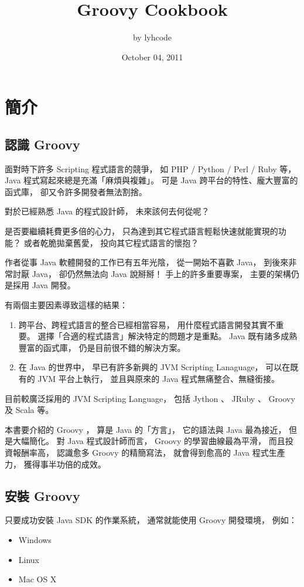 \documentclass[a4paper,12pt,english]{sphinxmanual}
\title{Groovy Cookbook}
\date{October 04, 2011}
\author{by lyhcode}
\begin{document}
\maketitle
\tableofcontents
{}\label{index::doc}



\chapter{簡介}
\label{intro:groovy-cookbook}\label{intro::doc}\label{intro:id1}

\section{認識 Groovy}
\label{intro:groovy}
面對時下許多 Scripting 程式語言的競爭，
如 PHP / Python / Perl / Ruby 等，
Java 程式寫起來總是充滿「麻煩與複雜」。
可是 Java 跨平台的特性、龐大豐富的函式庫，
卻又令許多開發者無法割捨。

對於已經熟悉 Java 的程式設計師，
未來該何去何從呢？

是否要繼續耗費更多倍的心力，
只為達到其它程式語言輕鬆快速就能實現的功能？
或者乾脆拋棄舊愛，
投向其它程式語言的懷抱？

作者從事 Java 軟體開發的工作已有五年光陰，
從一開始不喜歡 Java，
到後來非常討厭 Java，
卻仍然無法向 Java 說掰掰！
手上的許多重要專案，
主要的架構仍是採用 Java 開發。

有兩個主要因素導致這樣的結果：
\begin{enumerate}
\item {} 
跨平台、跨程式語言的整合已經相當容易，
用什麼程式語言開發其實不重要。
選擇「合適的程式語言」解決特定的問題才是重點。
Java 既有諸多成熟豐富的函式庫，
仍是目前很不錯的解決方案。

\item {} 
在 Java 的世界中，
早已有許多新興的 JVM Scripting Lanaguage，
可以在既有的 JVM 平台上執行，
並且與原來的 Java 程式無痛整合、無縫銜接。

\end{enumerate}

目前較廣泛採用的 JVM Scripting Language，
包括 Jython 、 JRuby 、 Groovy 及 Scala 等。

本書要介紹的 Groovy ，
算是 Java 的「方言」，
它的語法與 Java 最為接近，
但是大幅簡化。
對 Java 程式設計師而言，
Groovy 的學習曲線最為平滑，
而且投資報酬率高，
認識愈多 Groovy 的精簡寫法，
就會得到愈高的 Java 程式生產力，
獲得事半功倍的成效。


\section{安裝 Groovy}
\label{intro:id2}
只要成功安裝 Java SDK 的作業系統，
通常就能使用 Groovy 開發環境，
例如：
\begin{itemize}
\item {} 
Windows

\item {} 
Linux

\item {} 
Mac OS X

\end{itemize}
\end{document}
